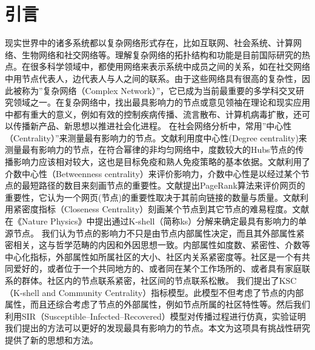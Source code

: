 \section{引言}
现实世界中的诸多系统都以复杂网络形式存在，比如互联网、社会系统、计算网络、生物网络和社交网络等。理解复杂网络的拓扑结构和功能是目前国际研究的热点。在很多科学领域中，都使用网络来表示系统中成员之间的关系，如在社交网络中用节点代表人，边代表人与人之间的联系。由于这些网络具有很高的复杂性，因此被称为”复杂网络（Complex Network）”\cite{watts1998collective,barabasi1999emergence,adamic2000power}，它已成为当前最重要的多学科交叉研究领域之一。在复杂网络中，找出最具影响力的节点\cite{pastor2002immunization,kempe2003maximizing,gomez2010inferring,budak2011limiting,mislove2007measurement,yuanweiguo2013}或意见领袖\cite{weng2010twitterrank}在理论和现实应用中都有重大的意义，例如有效的控制疾病传播\cite{xudan2007fuzai,pastor2001epidemic,pastor2002immunization,goltsev2012localization}、流言散布\cite{naveed2011bad,yi61zaixiansocial}、计算机病毒扩散\cite{yuan2008network}，还可以传播新产品\cite{swamynathan2008social}、新思想\cite{mislove2007measurement}以推进社会化进程。
在社会网络分析中，常用”中心性（Centrality）”来测量最有影响力的节点。文献\cite{everett1999centrality,albert2000error,pastor2001dynamical}利用度中心性(Degree centrality)来测量最有影响力的节点，在符合幂律的非均匀网络中，度数较大的Hubs节点的传播影响力应该相对较大，这也是目标免疫和熟人免疫策略的基本依据。文献\cite{freeman1979centrality,newman2005measure}利用了介数中心性（Betweenness centrality）来评价影响力，介数中心性是以经过某个节点的最短路径的数目来刻画节点的重要性。文献\cite{brin1998anatomy}提出PageRank算法来评价网页的重要性，它认为一个网页(节点)的重要性取决于其前向链接的数量与质量。文献\cite{opsahl2010node,sabidussi1966centrality}利用紧密度指标（Closeness Centrality）刻画某个节点到其它节点的难易程度。文献\cite{kitsak2010identification}在《Nature Physics》中提出通过K-shell（简称ks）\cite{carmi2007model}分解来确定最具有影响力的单源节点。
我们认为节点的影响力不只是由节点内部属性决定，而且其外部属性紧密相关，这与哲学范畴的内因和外因思想一致。内部属性如度数、紧密性、介数等中心化指标，外部属性如所属社区的大小、社区内关系紧密度等。社区\cite{girvan2002community,newman2006modularity,newman2012communities}是一个有共同爱好的，或者位于一个共同地方的、或者同在某个工作场所的、或者具有家庭联系的群体\cite{newman2013finding}。社区内的节点联系紧密，社区间的节点联系松散。
我们提出了KSC（K-shell and Community Centrality）指标模型。此模型不但考虑了节点的内部属性，而且还综合考虑了节点的外部属性，例如节点所属的社区特性等。然后我们利用SIR（Susceptible–Infected–Recovered）模型对传播过程进行仿真，实验证明我们提出的方法可以更好的发现最具有影响力的节点。本文为这项具有挑战性研究提供了新的思想和方法。

